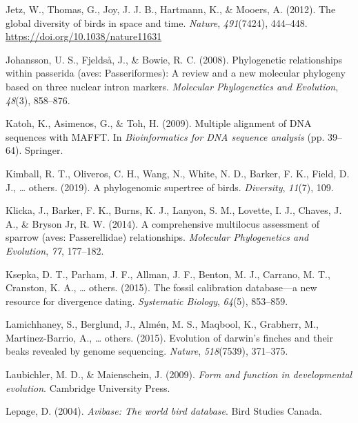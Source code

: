\documentclass[
  man]{apa6}
\newlength{\cslhangindent}
\newlength{\cslentryspacingunit} %
\newenvironment{CSLReferences}[2] %
 {%
  \setlength{\parindent}{0pt}
  \ifodd #1
  \let\oldpar\par
  \def\par{\hangindent=\cslhangindent\oldpar}
  \fi
  \setlength{\parskip}{#2\cslentryspacingunit}
 }%
 {}
\begin{document}
\begin{CSLReferences}{1}{0}
\leavevmode{}%
Jetz, W., Thomas, G., Joy, J. J. B., Hartmann, K., \& Mooers, A. (2012). {The global diversity of birds in space and time}. \emph{Nature}, \emph{491}(7424), 444--448. \url{https://doi.org/10.1038/nature11631}

\leavevmode{}%
Johansson, U. S., Fjeldså, J., \& Bowie, R. C. (2008). Phylogenetic relationships within passerida (aves: Passeriformes): A review and a new molecular phylogeny based on three nuclear intron markers. \emph{Molecular Phylogenetics and Evolution}, \emph{48}(3), 858--876.

\leavevmode{}%
Katoh, K., Asimenos, G., \& Toh, H. (2009). Multiple alignment of DNA sequences with MAFFT. In \emph{Bioinformatics for DNA sequence analysis} (pp. 39--64). Springer.

\leavevmode{}%
Kimball, R. T., Oliveros, C. H., Wang, N., White, N. D., Barker, F. K., Field, D. J., \ldots{} others. (2019). A phylogenomic supertree of birds. \emph{Diversity}, \emph{11}(7), 109.

\leavevmode{}%
Klicka, J., Barker, F. K., Burns, K. J., Lanyon, S. M., Lovette, I. J., Chaves, J. A., \& Bryson Jr, R. W. (2014). A comprehensive multilocus assessment of sparrow (aves: Passerellidae) relationships. \emph{Molecular Phylogenetics and Evolution}, \emph{77}, 177--182.

\leavevmode{}%
Ksepka, D. T., Parham, J. F., Allman, J. F., Benton, M. J., Carrano, M. T., Cranston, K. A., \ldots{} others. (2015). The fossil calibration database---a new resource for divergence dating. \emph{Systematic Biology}, \emph{64}(5), 853--859.

\leavevmode{}%
Lamichhaney, S., Berglund, J., Almén, M. S., Maqbool, K., Grabherr, M., Martinez-Barrio, A., \ldots{} others. (2015). Evolution of darwin's finches and their beaks revealed by genome sequencing. \emph{Nature}, \emph{518}(7539), 371--375.

\leavevmode{}%
Laubichler, M. D., \& Maienschein, J. (2009). \emph{Form and function in developmental evolution}. Cambridge University Press.

\leavevmode{}%
Lepage, D. (2004). \emph{Avibase: The world bird database}. Bird Studies Canada.


\end{CSLReferences}
\end{document}
